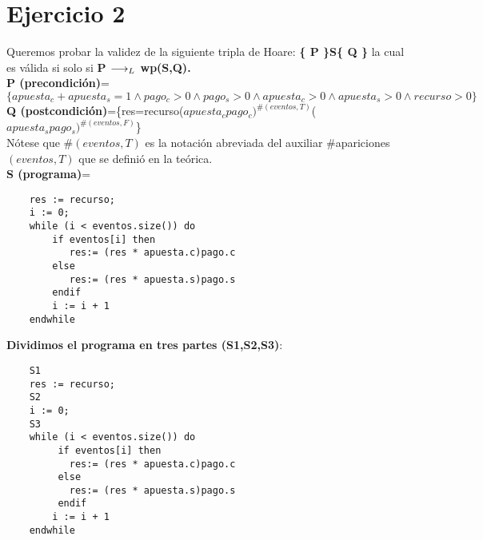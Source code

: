 \documentclass[10pt,a4paper]{article}
\begin{document}
\section{Ejercicio 2}
\begin{flushleft}
Queremos probar  la validez de la siguiente tripla de Hoare:
\textbf{\{ P \}S\{ Q \}} la cual es válida si solo si \textbf{{P $\longrightarrow _L$ wp(S,Q)}.}\\                                  
\vspace{3mm}
\textbf{P (precondición)}=$\{ apuesta_c + apuesta_s =1 \wedge pago_c>0 \wedge pago_s>0 \wedge apuesta_c>0 \wedge apuesta_s>0 \wedge recurso>0\}$\\
\vspace{3mm}
\textbf{Q (postcondición)}=\{res=recurso($apuesta_cpago_c)^{\#(eventos,T)}$($apuesta_spago_s)^{\#(eventos,F)}$\}\\
\vspace{3mm}
Nótese que \#$(eventos, T)$ es la notación abreviada del auxiliar {\normalfont\ttfamily\#apariciones$(eventos, T)$} 
que se definió en la teórica. \\
\vspace{34mm}
\textbf{S (programa)}=
\begin{lstlisting}
	res := recurso;
	i := 0;
	while (i < eventos.size()) do
	    if eventos[i] then
		   res:= (res * apuesta.c)pago.c
		else
		   res:= (res * apuesta.s)pago.s
		endif
		i := i + 1
	endwhile
\end{lstlisting} 

\vspace{3mm}
\textbf{Dividimos el programa en tres partes (S1,S2,S3)}:\\
\begin{lstlisting}
	S1
	res := recurso;
	S2
	i := 0;
	S3
	while (i < eventos.size()) do
	     if eventos[i] then
		   res:= (res * apuesta.c)pago.c
		 else
		   res:= (res * apuesta.s)pago.s
		 endif
		i := i + 1
	endwhile
		\end{lstlisting} 


\end{flushleft}
\end{document}
